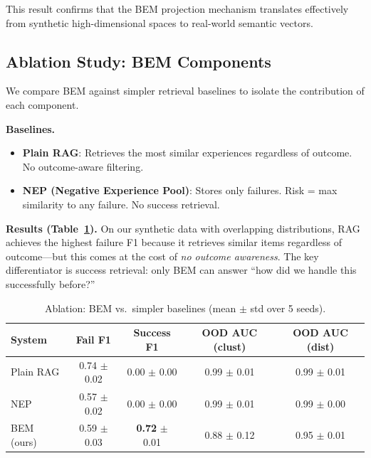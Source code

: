 \documentclass[twoside,11pt]{article}
\begin{document}
This result confirms that the BEM projection mechanism translates effectively from synthetic high-dimensional spaces to real-world semantic vectors.

\subsection{Ablation Study: BEM Components}
\label{sec:ablation}

We compare BEM against simpler retrieval baselines to isolate the contribution of each component.

\textbf{Baselines.}
\begin{itemize}
    \item \textbf{Plain RAG}: Retrieves the most similar experiences regardless of outcome. No outcome-aware filtering.
    \item \textbf{NEP (Negative Experience Pool)}: Stores only failures. Risk = max similarity to any failure. No success retrieval.
\end{itemize}

\textbf{Results (Table~\ref{tab:ablation}).} On our synthetic data with overlapping distributions, RAG achieves the highest failure F1 because it retrieves similar items regardless of outcome---but this comes at the cost of \emph{no outcome awareness}. The key differentiator is success retrieval: only BEM can answer ``how did we handle this successfully before?''

\begin{table}[t]
\centering
\caption{Ablation: BEM vs.\ simpler baselines (mean $\pm$ std over 5 seeds).}
\label{tab:ablation}
\begin{tabular}{lcccc}
\toprule
\textbf{System} & \textbf{Fail F1} & \textbf{Success F1} & \textbf{OOD AUC (clust)} & \textbf{OOD AUC (dist)} \\
\midrule
Plain RAG & 0.74 \small{$\pm$ 0.02} & 0.00 \small{$\pm$ 0.00} & 0.99 \small{$\pm$ 0.01} & 0.99 \small{$\pm$ 0.01} \\
NEP & 0.57 \small{$\pm$ 0.02} & 0.00 \small{$\pm$ 0.00} & 0.99 \small{$\pm$ 0.01} & 0.99 \small{$\pm$ 0.00} \\
BEM (ours) & 0.59 \small{$\pm$ 0.03} & \textbf{0.72} \small{$\pm$ 0.01} & 0.88 \small{$\pm$ 0.12} & 0.95 \small{$\pm$ 0.01} \\
\bottomrule
\end{tabular}
\end{table}
\end{document}
